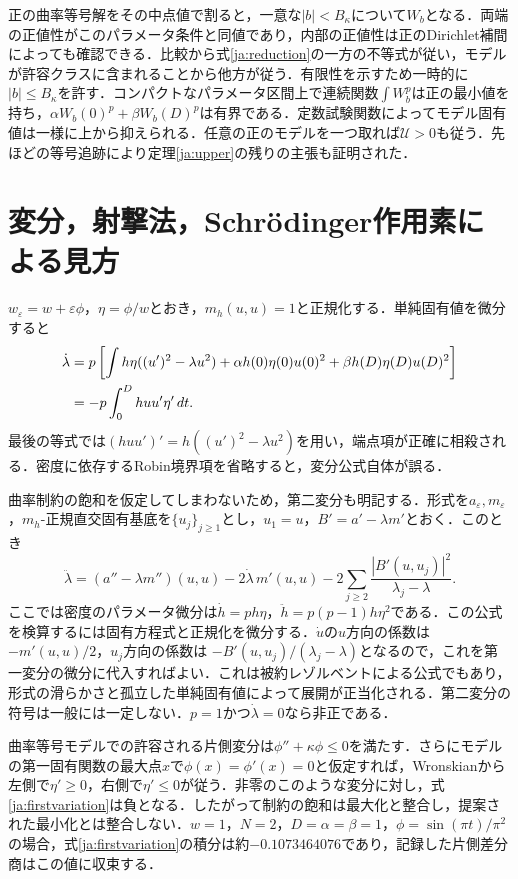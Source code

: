 \documentclass[12pt]{amsart}
\theoremstyle{definition}
\theoremstyle{remark}
\numberwithin{equation}{section}
\begin{document}
正の曲率等号解をその中点値で割ると，一意な$|b|<B_\kappa$について$W_b$となる．両端の正値性がこのパラメータ条件と同値であり，内部の正値性は正のDirichlet補間によっても確認できる．比較から式\eqref{ja:reduction}の一方の不等式が従い，モデルが許容クラスに含まれることから他方が従う．有限性を示すため一時的に$|b|\le B_\kappa$を許す．コンパクトなパラメータ区間上で連続関数$\int W_b^p$は正の最小値を持ち，$\alpha W_b(0)^p+\beta W_b(D)^p$は有界である．定数試験関数によってモデル固有値は一様に上から抑えられる．任意の正のモデルを一つ取れば$\mathcal U>0$も従う．先ほどの等号追跡により定理\ref{ja:upper}の残りの主張も証明された．

\section{変分，射撃法，Schr\"odinger作用素による見方}
$w_\varepsilon=w+\varepsilon\phi$，$\eta=\phi/w$とおき，$m_h(u,u)=1$と正規化する．単純固有値を微分すると
\begin{align}\label{ja:firstvariation}
 \dot\lambda&=p\left[\int h\eta((u')^2-\lambda u^2)
 +\alpha h(0)\eta(0)u(0)^2+\beta h(D)\eta(D)u(D)^2\right]\\
 &=-p\int_0^D hu u'\eta'\,dt.\notag
\end{align}
最後の等式では$(huu')'=h((u')^2-\lambda u^2)$を用い，端点項が正確に相殺される．密度に依存するRobin境界項を省略すると，変分公式自体が誤る．

曲率制約の飽和を仮定してしまわないため，第二変分も明記する．形式を$a_\varepsilon,m_\varepsilon$，$m_h$-正規直交固有基底を$\{u_j\}_{j\ge1}$とし，$u_1=u$，$B'=a'-\lambda m'$とおく．このとき
\begin{equation}\label{ja:secondvariation}
 \ddot\lambda=(a''-\lambda m'')(u,u)-2\dot\lambda\,m'(u,u)
 -2\sum_{j\ge2}\frac{|B'(u,u_j)|^2}{\lambda_j-\lambda}.
\end{equation}
ここでは密度のパラメータ微分は$\dot h=p h\eta$，$\ddot h=p(p-1)h\eta^2$である．この公式を検算するには固有方程式と正規化を微分する．$\dot u$の$u$方向の係数は$-m'(u,u)/2$，$u_j$方向の係数は
$-B'(u,u_j)/(\lambda_j-\lambda)$となるので，これを第一変分の微分に代入すればよい．これは被約レゾルベントによる公式でもあり，形式の滑らかさと孤立した単純固有値によって展開が正当化される．第二変分の符号は一般には一定しない．$p=1$かつ$\dot\lambda=0$なら非正である．

曲率等号モデルでの許容される片側変分は$\phi''+\kappa\phi\le0$を満たす．さらにモデルの第一固有関数の最大点$x$で$\phi(x)=\phi'(x)=0$と仮定すれば，Wronskianから左側で$\eta'\ge0$，右側で$\eta'\le0$が従う．非零のこのような変分に対し，式\eqref{ja:firstvariation}は負となる．したがって制約の飽和は最大化と整合し，提案された最小化とは整合しない．$w=1$，$N=2$，$D=\alpha=\beta=1$，$\phi=\sin(\pi t)/\pi^2$の場合，式\eqref{ja:firstvariation}の積分は約$-0.1073464076$であり，記録した片側差分商はこの値に収束する．
\end{document}
